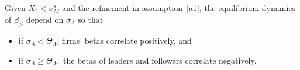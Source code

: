 \documentclass[nogrid,nosurname,sort&compress]{RFS}
\begin{document}
\begin{proposition}\label{p4}
Given $X_{t}<x_{M}^{s}$ and the refinement in assumption~\ref{a1}, the equilibrium dynamics of
$\beta _{jt}$ depend on $\sigma _{\Lambda }$ so that
\begin{itemize}
\item if $\sigma _{\Lambda }<\Theta _{\Lambda }$, firms' betas correlate
positively, and
\item if $\sigma _{\Lambda }\geq \Theta _{\Lambda },$ the betas of
leaders and followers correlate negatively.%
\label{proposition: betas}
\end{itemize}
\end{proposition}



\end{document}

